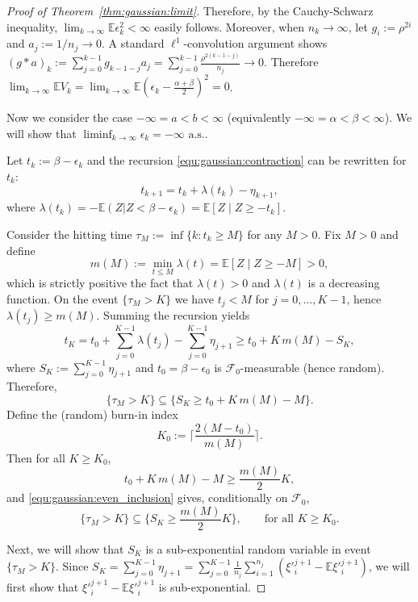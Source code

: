 \begin{proof}[Proof of Theorem~\ref{thm:gaussian:limit}]
Therefore, by the Cauchy-Schwarz inequality, $\lim_{k \to \infty} \mathbb{E} \epsilon^2_k < \infty$ easily follows.
Moreover, when $n_k \to \infty$, let $g_i:=\rho^{2i}$ and $a_j:=1/n_j\to 0$. A standard $\ell^1$-convolution argument shows $(g*a)_k:=\sum_{j=0}^{k-1} g_{k-1-j}a_j = \sum_{j=0}^{k-1}\frac{\rho^{2(k-1-j)}}{n_j} \to 0$.
Therefore $\lim_{k \to \infty}\mathbb{E} V_k = \lim_{k \to \infty}\mathbb{E} (\epsilon_k - \frac{\alpha+\beta}{2})^2 = 0$.


Now we consider the case $-\infty= a < b < \infty$ (equivalently $-\infty= \alpha < \beta < \infty$). We will show that $\liminf_{k \to \infty} \epsilon_k = -\infty \text{ a.s.}$.

Let $t_k := \beta - \epsilon_k$ and the recursion \eqref{equ:gaussian:contraction} can be rewritten for $t_k$:
\[
t_{k+1} = t_k + \lambda(t_k) - \eta_{k+1},
\]
where $\lambda(t_k) = -\mathbb{E}(Z|Z < \beta - \epsilon_k) =\mathbb{E}[Z \mid Z \geq -t_k]$.

Consider the hitting time $\tau_M := \inf\{k : t_k \geq M\}$ for any $M > 0$.
Fix $M > 0$ and define
\[
m(M) := \min_{t \leq M} \lambda(t) = \mathbb{E}[Z \mid Z \geq -M] > 0,
\]
which is strictly positive the fact that $\lambda(t) > 0$ and $\lambda(t)$ is a decreasing function.
On the event $\{\tau_M > K\}$ we have $t_j < M$ for $j = 0, \dots, K-1$, hence $\lambda(t_j) \geq m(M)$.
Summing the recursion yields
\[
t_K = t_0 + \sum_{j=0}^{K-1} \lambda(t_j) - \sum_{j=0}^{K-1} \eta_{j+1}
\geq t_0 + K\,m(M) - S_K,
\]
where $S_K := \sum_{j=0}^{K-1} \eta_{j+1}$ and $t_0 = \beta - \epsilon_0$ is $\mathcal{F}_0$-measurable (hence random). Therefore,
\begin{equation}\label{equ:gaussian:even_inclusion}
\{\tau_M > K\} \subseteq \Big\{ S_K \geq t_0 + K\,m(M) - M \Big\}.
\end{equation}
Define the (random) burn-in index
\[
K_0 := \Big\lceil \frac{2(M-t_0)}{m(M)} \Big\rceil.
\]
Then for all $K \geq K_0$,
\[
t_0 + K\,m(M) - M \geq \frac{m(M)}{2} K,
\]
and \eqref{equ:gaussian:even_inclusion} gives, conditionally on $\mathcal{F}_0$,
\begin{equation}\label{equ:gaussian:even_inclusion2}
\{\tau_M > K\} \subseteq \Big\{ S_K \geq \frac{m(M)}{2} K \Big\}, \qquad \text{for all } K \geq K_0.
\end{equation}

Next, we will show that $S_K$ is a sub-exponential random variable in event $\{\tau_M > K\}$.
Since $S_K = \sum_{j=0}^{K-1} \eta_{j+1} = \sum_{j=0}^{K-1} \frac{1}{n_j}\sum_{i=1}^{n_j}\left(\xi'^{j+1}_i -\mathbb{E}\xi'^{j+1}_i\right)$, we will first show that $\xi'^{j+1}_i -\mathbb{E}\xi'^{j+1}_i$ is sub-exponential.


\end{proof}
